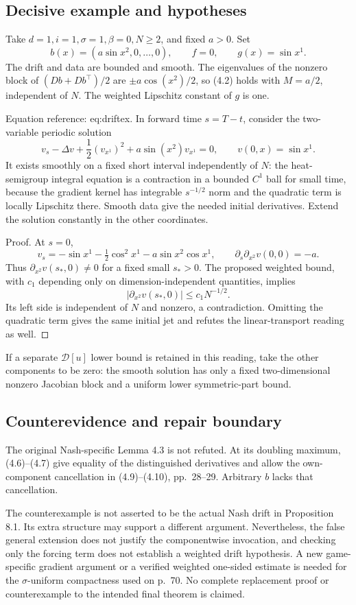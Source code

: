 \documentclass[10pt]{article}
\begin{document}
\subsection*{Decisive example and hypotheses}
Take \(d=1,i=1,\sigma=1,\beta=0,N\ge2\), and fixed \(a>0\). Set \[b(x)=(a\sin x^2,0,\ldots,0),\qquad f=0,\qquad g(x)=\sin x^1.\] The drift and data are bounded and smooth. The eigenvalues of the nonzero block of \((Db+Db^\top)/2\) are \(\pm a\cos(x^2)/2\), so (4.2) holds with \(M=a/2\), independent of \(N\). The weighted Lipschitz constant of \(g\) is one.\par
Equation reference: eq:driftex. In forward time \(s=T-t\), consider the two-variable periodic solution \[
v_s-\Delta v+\frac12(v_{x^1})^2+a\sin(x^2)v_{x^1}=0,
\qquad v(0,x)=\sin x^1.\] It exists smoothly on a fixed short interval independently of \(N\): the heat-semigroup integral equation is a contraction in a bounded \(C^1\) ball for small time, because the gradient kernel has integrable \(s^{-1/2}\) norm and the quadratic term is locally Lipschitz there. Smooth data give the needed initial derivatives. Extend the solution constantly in the other coordinates.\par
Proof. At \(s=0\), \[v_s=-\sin x^1-\tfrac12\cos^2x^1-a\sin x^2\cos x^1,
\qquad \partial_s\partial_{x^2}v(0,0)=-a.\] Thus \(\partial_{x^2}v(s_*,0)\ne0\) for a fixed small \(s_*>0\). The proposed weighted bound, with \(c_1\) depending only on dimension-independent quantities, implies \[|\partial_{x^2}v(s_*,0)|\le c_1N^{-1/2}.\] Its left side is independent of \(N\) and nonzero, a contradiction. Omitting the quadratic term gives the same initial jet and refutes the linear-transport reading as well. ◻\par
If a separate \(\mathcal D[u]\) lower bound is retained in this reading, take the other components to be zero: the smooth solution has only a fixed two-dimensional nonzero Jacobian block and a uniform lower symmetric-part bound.\par
\subsection*{Counterevidence and repair boundary}
The original Nash-specific Lemma 4.3 is not refuted. At its doubling maximum, (4.6)–(4.7) give equality of the distinguished derivatives and allow the own-component cancellation in (4.9)–(4.10), pp. 28–29. Arbitrary \(b\) lacks that cancellation.\par
The counterexample is not asserted to be the actual Nash drift in Proposition 8.1. Its extra structure may support a different argument. Nevertheless, the false general extension does not justify the componentwise invocation, and checking only the forcing term does not establish a weighted drift hypothesis. A new game-specific gradient argument or a verified weighted one-sided estimate is needed for the \(\sigma\)-uniform compactness used on p. 70. No complete replacement proof or counterexample to the intended final theorem is claimed.\par
\end{document}
